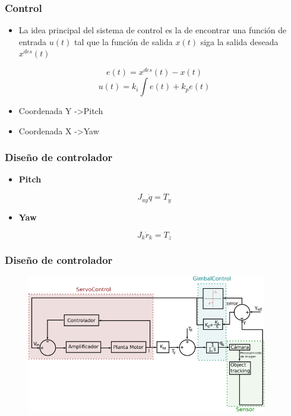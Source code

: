 \documentclass[11pt]{beamer}
\begin{document}
  \begin{frame}
    \frametitle{Control}
    \begin{itemize}
      \item La idea principal del sistema de control es la de encontrar una función de
      entrada $u(t)$ tal que la función de salida $x(t)$ siga la salida deseada $x^{des}(t)$
    \end{itemize}
    \begin{equation}
      e(t) = x^{des}(t) - x(t)
    \end{equation}
    \begin{equation}
      u(t) = k_i \int e(t) + k_p e(t)
    \end{equation}
    \begin{itemize}
      \item Coordenada Y -\textgreater Pitch
      \item Coordenada X -\textgreater Yaw
    \end{itemize}
  \end{frame}
  \begin{frame}
    \frametitle{Diseño de controlador}
    \begin{itemize}
      \item \textbf{Pitch} 
    \end{itemize}
    \begin{equation}
      J_{ay}\dot{q} = T_y 
    \end{equation}
    \begin{itemize}
      \item \textbf{Yaw}
    \end{itemize}
    \begin{equation}
      J_k\dot{r}_k = T_z
    \end{equation}
  \end{frame}
  \begin{frame}
    \frametitle{Diseño de controlador}
    \begin{figure}
      \includegraphics[width=10.5cm, keepaspectratio]{images/lazo-control-pitch.png}
    \end{figure}
  \end{frame}
\end{document}
